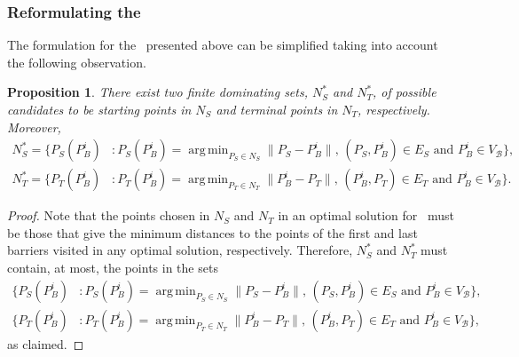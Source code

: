 \documentclass[a4paper,  review, authoryear, 1p.]{elsarticle}
\DeclareMathOperator*{\argmin}{arg\,min}
\newcommand{\SPPN}{{\sf{H-SPPN}\xspace }}
\newcommand{\VB}{{V^{}_{\mathcal B}}}
\newtheorem{prop}{Proposition}
\begin{document}
	\subsubsection{Reformulating the \SPPN}\label{section:reformulation}
	The formulation for the \SPPN \ presented above can be simplified taking into account the following observation.
	\begin{prop}
		There exist two finite dominating sets, $N_S^*$ and $N_T^*$, of possible candidates to be starting points in $N_S$ and terminal points in $N_T$, respectively. Moreover,
		\begin{align*}
			N^*_S=\{P_S(P_B^i)&:P_S(P_B^i)=\argmin_{P_S\in N_S} \|P_S - P_B^i\|,\,(P_S, P_B^i)\in E_S\text{ and }P_B^i\in\VB\},\\
			N^*_T=\{P_T(P_B^i)&:P_T(P_B^i)=\argmin_{P_T\in N_T} \|P_B^i - P_T\|,\,(P_B^i, P_T)\in E_T\text{ and }P_B^i\in\VB\}.
		\end{align*} 
	\end{prop}
	\begin{proof}
		Note that the points chosen in $N_S$ and $N_T$ in an optimal solution for \SPPN \ must be those that give the minimum distances to the points of the first and last barriers visited in any optimal solution, respectively. Therefore, $N_S^*$ and $N_T^*$ must contain, at most, the points in the sets
		\begin{align*}
			\{P_S(P_B^i)&:P_S(P_B^i)=\argmin_{P_S\in N_S} \|P_S - P_B^i\|,\,(P_S, P_B^i)\in E_S\text{ and }P_B^i\in\VB\},\\
			\{P_T(P_B^i)&:P_T(P_B^i)=\argmin_{P_T\in N_T} \|P_B^i - P_T\|,\,(P_B^i, P_T)\in E_T\text{ and }P_B^i\in\VB\},
		\end{align*} 
		as claimed.
	\end{proof}
	\noindent
	
\end{document}
